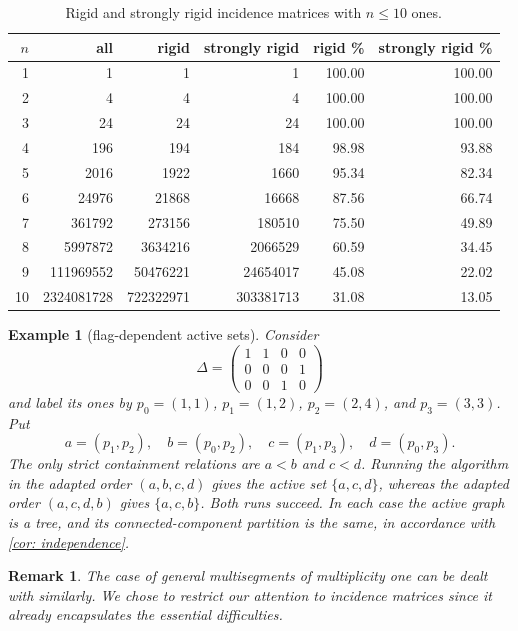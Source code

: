\documentclass[12pt]{article}
\newtheorem{remark}[theorem]{Remark}
\newtheorem{example}[theorem]{Example}
\newcommand{\IM}{\Delta}
\begin{document}
\begin{table}[htbp]
\centering
\caption{Rigid and strongly rigid incidence matrices with $n\le 10$ ones.}
\label{tab: rigidcounts}
\begin{tabular}{|r|r|r|r|r|r|}
\hline
$n$ & all & rigid & strongly rigid & rigid \% & strongly rigid \%\\
\hline
1 & 1 & 1 & 1 & 100.00 & 100.00\\
2 & 4 & 4 & 4 & 100.00 & 100.00\\
3 & 24 & 24 & 24 & 100.00 & 100.00\\
4 & 196 & 194 & 184 & 98.98 & 93.88\\
5 & 2016 & 1922 & 1660 & 95.34 & 82.34\\
6 & 24976 & 21868 & 16668 & 87.56 & 66.74\\
7 & 361792 & 273156 & 180510 & 75.50 & 49.89\\
8 & 5997872 & 3634216 & 2066529 & 60.59 & 34.45\\
9 & 111969552 & 50476221 & 24654017 & 45.08 & 22.02\\
10 & 2324081728 & 722322971 & 303381713 & 31.08 & 13.05\\
\hline
\end{tabular}
\end{table}


\begin{example}[flag-dependent active sets] \label{exam: flagdep}
Consider
\[
 \IM=\begin{pmatrix}1&1&0&0\\0&0&0&1\\0&0&1&0\end{pmatrix}
\]
and label its ones by
$p_0=(1,1)$, $p_1=(1,2)$, $p_2=(2,4)$, and $p_3=(3,3)$.  Put
\[
 a=(p_1,p_2),\quad b=(p_0,p_2),\quad
 c=(p_1,p_3),\quad d=(p_0,p_3).
\]
The only strict containment relations are $a<b$ and $c<d$.  Running the algorithm in the
adapted order $(a,b,c,d)$ gives the active set $\{a,c,d\}$, whereas the adapted order
$(a,c,d,b)$ gives $\{a,c,b\}$.  Both runs succeed.  In each case the active graph is a
tree, and its connected-component partition is the same, in accordance with \cref{cor: independence}.
\end{example}

\begin{remark}
The case of general multisegments of multiplicity one can be dealt with similarly.
We chose to restrict our attention to incidence matrices since it already encapsulates the essential difficulties.
\end{remark}
\end{document}
